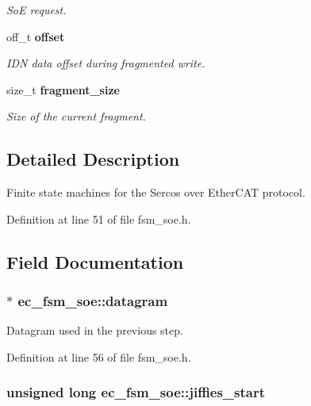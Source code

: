 \begin{DoxyCompactItemize}
\begin{DoxyCompactList}\small\item\em \-So\-E request. \end{DoxyCompactList}\item 
off\-\_\-t {\bf offset}
\begin{DoxyCompactList}\small\item\em \-I\-D\-N data offset during fragmented write. \end{DoxyCompactList}\item 
size\-\_\-t {\bf fragment\-\_\-size}
\begin{DoxyCompactList}\small\item\em \-Size of the current fragment. \end{DoxyCompactList}\end{DoxyCompactItemize}


\subsection{\-Detailed \-Description}
\-Finite state machines for the \-Sercos over \-Ether\-C\-A\-T protocol. 

\-Definition at line 51 of file fsm\-\_\-soe.\-h.



\subsection{\-Field \-Documentation}
\subsubsection[{datagram}]{$\ast$ {\bf ec\-\_\-fsm\-\_\-soe\-::datagram}}\label{structec__fsm__soe_ad94b8e0cd3aeb06cc554b1405bf02436}


\-Datagram used in the previous step. 



\-Definition at line 56 of file fsm\-\_\-soe.\-h.

\subsubsection[{jiffies\-\_\-start}]{\setlength{\rightskip}{0pt plus 5cm}unsigned long {\bf ec\-\_\-fsm\-\_\-soe\-::jiffies\-\_\-start}}\label{structec__fsm__soe_ad9dc7d3d67af743a7181a878f23faa84}


